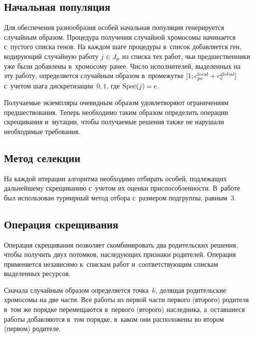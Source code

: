 \begin{multicols}{2}
\vspace*{-6pt}
  
  \subsection{Начальная популяция}
  
  Для обеспечения разнообразия особей начальная популяция генерируется 
случайным образом. Процедура получения случайной хромосомы начинается 
с~пустого списка генов. На каждом шаге процедуры в~список добавляется ген, 
кодирующий случайную работу $j\hm\in J_p$ из списка тех работ, чьи 
предшественники уже были добавлены в~хромосому ранее. Число 
исполнителей, выделенных на эту работу, определяется случайным образом 
в~промежутке $[1; c_{pe}^{\mathrm{local}}\hm+c_e^{\mathrm{global}}]$ с~учетом шага 
дискретизации~$0{,}1$, где $\mathrm{Spec}(j)\hm=e$.
  
  Получаемые экземпляры очевидным образом удовлетворяют ограничениям 
предшествования. Теперь необходимо таким образом определить операции 
скрещивания и~мутации, чтобы получаемые решения также не нарушали 
необходимые требования.

\vspace*{-6pt}
  
  \subsection{Метод селекции}
  
  На каждой итерации алгоритма необходимо отбирать особей, подлежащих 
дальнейшему скрещиванию с~учетом их оценки приспособленности. В~работе 
был использован турнирный метод отбора с~размером подгруппы, равным~3.

\vspace*{-6pt}
  
  \subsection{Операция скрещивания}
  
  Операция скрещивания позволяет скомбинировать два родительских 
решения, чтобы получить двух потомков, наследующих признаки родителей. 
Операция применяется независимо к~спискам работ и~соответствующим 
спискам выделенных ресурсов.
  
  Сначала случайным образом определяется точка~$k$, делящая родительские 
хромосомы на две час\-ти. Все работы из первой части первого (второго) 
родителя в~том же порядке перемещаются в~первого (второго) наследника, 
а~оставшиеся работы до\-бав\-ля\-ют\-ся в~том порядке, в~каком они расположены во 
втором (первом) родителе.



\end{multicols}
